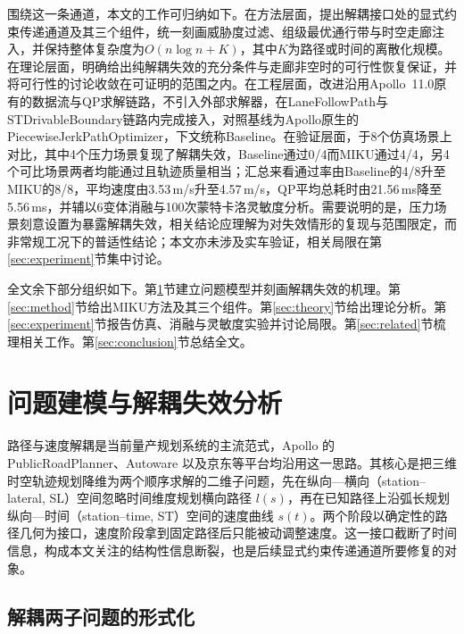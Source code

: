 \documentclass[a4paper,11pt]{ctexart}
\theoremstyle{definition}
\begin{document}
围绕这一条通道，本文的工作可归纳如下。在方法层面，提出解耦接口处的显式约束传递通道及其三个组件，统一刻画威胁度过滤、组级最优通行带与时空走廊注入，并保持整体复杂度为$O(n\log n + K)$，其中$K$为路径或时间的离散化规模。在理论层面，明确给出纯解耦失效的充分条件与走廊非空时的可行性恢复保证，并将可行性的讨论收敛在可证明的范围之内。在工程层面，改进沿用Apollo~11.0原有的数据流与QP求解链路，不引入外部求解器，在LaneFollowPath与STDrivableBoundary链路内完成接入，对照基线为Apollo原生的PiecewiseJerkPathOptimizer，下文统称Baseline。在验证层面，于8个仿真场景上对比，其中4个压力场景复现了解耦失效，Baseline通过0/4而MIKU通过4/4，另4个可比场景两者均能通过且轨迹质量相当；汇总来看通过率由Baseline的4/8升至MIKU的8/8，平均速度由3.53\,m/s升至4.57\,m/s，QP平均总耗时由21.56\,ms降至5.56\,ms，并辅以6变体消融与100次蒙特卡洛灵敏度分析。需要说明的是，压力场景刻意设置为暴露解耦失效，相关结论应理解为对失效情形的复现与范围限定，而非常规工况下的普适性结论；本文亦未涉及实车验证，相关局限在第\ref{sec:experiment}节集中讨论。

全文余下部分组织如下。第\ref{sec:problem}节建立问题模型并刻画解耦失效的机理。第\ref{sec:method}节给出MIKU方法及其三个组件。第\ref{sec:theory}节给出理论分析。第\ref{sec:experiment}节报告仿真、消融与灵敏度实验并讨论局限。第\ref{sec:related}节梳理相关工作。第\ref{sec:conclusion}节总结全文。

\section{问题建模与解耦失效分析}
\label{sec:problem}

路径与速度解耦是当前量产规划系统的主流范式，Apollo 的 PublicRoadPlanner、Autoware 以及京东等平台均沿用这一思路。其核心是把三维时空轨迹规划降维为两个顺序求解的二维子问题，先在纵向—横向（station--lateral, SL）空间忽略时间维度规划横向路径 $l(s)$，再在已知路径上沿弧长规划纵向—时间（station--time, ST）空间的速度曲线 $s(t)$。两个阶段以确定性的路径几何为接口，速度阶段拿到固定路径后只能被动调整速度。这一接口截断了时间信息，构成本文关注的结构性信息断裂，也是后续显式约束传递通道所要修复的对象。

\subsection{解耦两子问题的形式化}
\label{subsec:decouple_formalize}
\end{document}
